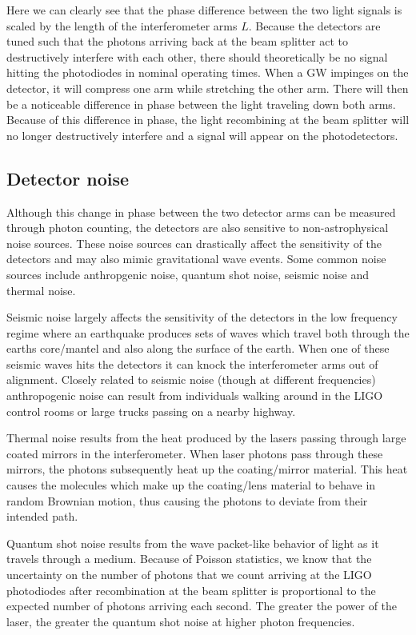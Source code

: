 Here we can clearly see that the phase difference 
between the two light signals is scaled by the 
length of the interferometer arms $L$. Because the 
detectors are tuned such that the photons arriving 
back at the beam splitter act to destructively 
interfere with each other, there should theoretically 
be no signal hitting the photodiodes in nominal operating times. When a \ac{GW} 
impinges on the detector, it will compress one arm 
while stretching the other arm. There will then be a 
noticeable difference in phase between the light traveling 
down both arms. Because of this difference in phase, the 
light recombining at the beam splitter will no longer 
destructively interfere and a signal will appear 
on the photodetectors.

\subsection{Detector noise}

Although this change in phase between 
the two detector arms can be measured through 
photon counting, the detectors are 
also sensitive to non-astrophysical noise 
sources. These noise sources can drastically affect 
the sensitivity of the detectors and may also mimic 
gravitational wave events. Some common noise sources 
include anthropgenic noise, quantum shot noise, 
seismic noise and thermal noise. 

Seismic noise largely affects the sensitivity of 
the detectors in the low frequency regime where 
an earthquake produces sets of waves which travel both 
through the earths core/mantel and also along the 
surface of the earth. When one of these seismic waves 
hits the detectors it can knock the interferometer arms 
out of alignment. Closely related to seismic noise 
(though at different frequencies) anthropogenic noise 
can result from individuals walking around in the 
\ac{LIGO} control rooms or large trucks passing 
on a nearby highway.

%
%
Thermal noise results from the heat produced by 
the lasers passing through large coated mirrors in 
the interferometer. When laser photons pass through 
these mirrors, the photons subsequently heat up 
the coating/mirror material. This heat causes the molecules 
which make up the coating/lens material to behave in 
random Brownian motion, thus causing the photons to deviate from 
their intended path.

Quantum shot noise results from the wave packet-like 
behavior of light as it travels through a medium. 
Because of Poisson statistics, we know that the 
uncertainty on the number of photons that we 
count arriving at the \ac{LIGO} photodiodes 
after recombination at the beam splitter is 
proportional to the expected number of photons 
arriving each second. The greater the power 
of the laser, the greater the quantum shot 
noise at higher photon frequencies.

